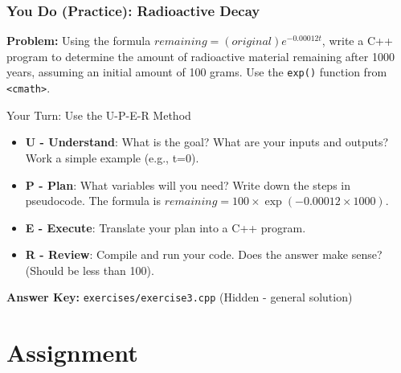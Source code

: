 \documentclass{beamer}
\begin{document}
\begin{frame}
\frametitle{You Do (Practice): Radioactive Decay}
\textbf{Problem:} Using the formula $remaining = (original)e^{-0.00012t}$, write a C++ program to determine the amount of radioactive material remaining after \alert{1000 years}, assuming an initial amount of \alert{100 grams}. Use the \texttt{exp()} function from \texttt{<cmath>}.

\vfill

\begin{block}{Your Turn: Use the U-P-E-R Method}
\begin{itemize}
    \item \textbf{U - Understand}: What is the goal? What are your inputs and outputs? Work a simple example (e.g., t=0).
    \item \textbf{P - Plan}: What variables will you need? Write down the steps in pseudocode. The formula is $remaining = 100 \times \exp(-0.00012 \times 1000)$.
    \item \textbf{E - Execute}: Translate your plan into a C++ program.
    \item \textbf{R - Review}: Compile and run your code. Does the answer make sense? (Should be less than 100).
\end{itemize}
\end{block}
\vfill
\textbf{Answer Key:} \texttt{exercises/exercise3.cpp} (Hidden - general solution)
\end{frame}

\section{Assignment}
\end{document}

